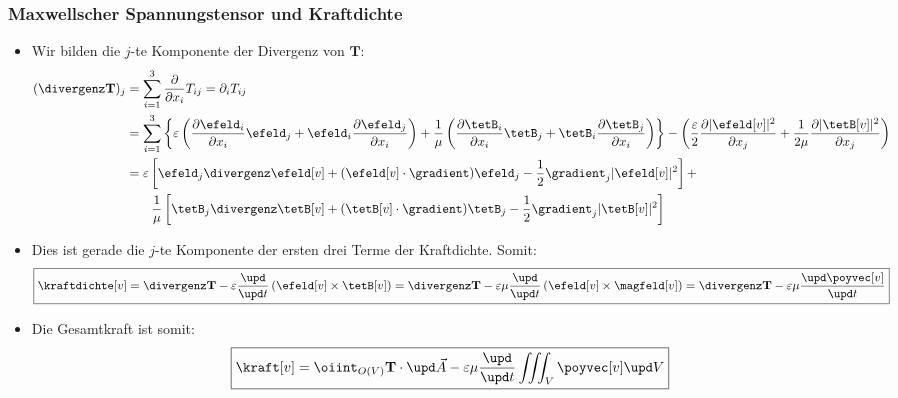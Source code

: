 \begin{frame}
  \frametitle{Maxwellscher Spannungstensor und Kraftdichte}
  \begin{itemize}[<+->]
  \item Wir bilden die \(j\)-te Komponente der Divergenz von \(\mathbf{T}\):
    \begin{align*}
      (\divergenz\mathbf{T})_j &= \sum_{i=1}^3 \frac{\partial}{\partial x_i} T_{ij} = \partial_i T_{ij} \\
                              &= \sum_{i=1}^3 \left\{ \varepsilon\left( \frac{\partial \efeld_i}{\partial x_i} \efeld_j + \efeld_i\frac{\partial \efeld_j}{\partial x_i} \right) +
\frac{1}{\mu}\left( \frac{\partial \tetB_i}{\partial x_i} \tetB_j + \tetB_i\frac{\partial \tetB_j}{\partial x_i} \right)
                                \right\} - \left(\frac{\varepsilon}{2}\frac{\partial |\efeld[v]|^2}{\partial x_j} + \frac{1}{2\mu}\frac{\partial |\tetB[v]|^2}{\partial x_j}\right)\\
                              &=\varepsilon\left[\efeld_j \divergenz\efeld[v] + (\efeld[v]\cdot\gradient )\efeld_j - \frac{1}{2}\gradient_j |\efeld[v]|^2 \right] +\\
                               &\qquad \frac{1}{\mu}\left[\tetB_j \divergenz\tetB[v] + (\tetB[v]\cdot\gradient )\tetB_j - \frac{1}{2}\gradient_j |\tetB[v]|^2 \right]
    \end{align*}
  \item Dies ist gerade die \(j\)-te Komponente der ersten drei Terme der Kraftdichte. Somit:
    \begin{equation*}
      \boxed{\kraftdichte[v] = \divergenz \mathbf{T} - \varepsilon\frac{\upd}{\upd t}\left( \efeld[v] \times \tetB[v]\right) 
                   = \divergenz \mathbf{T} - \varepsilon\mu\frac{\upd}{\upd t}\left( \efeld[v] \times \magfeld[v]\right) 
      = \divergenz \mathbf{T} - \varepsilon\mu\frac{\upd \poyvec[v]}{\upd t}}
  \end{equation*}
\item Die Gesamtkraft ist somit:
  \begin{equation*}
  \boxed{\kraft[v] = \oiint_{O(V)} \mathbf{T} \cdot \upd\vec{A} - \varepsilon\mu\frac{\upd}{\upd t} \iiint_V \poyvec[v] \upd V}
\end{equation*}
\end{itemize}
\end{frame}

